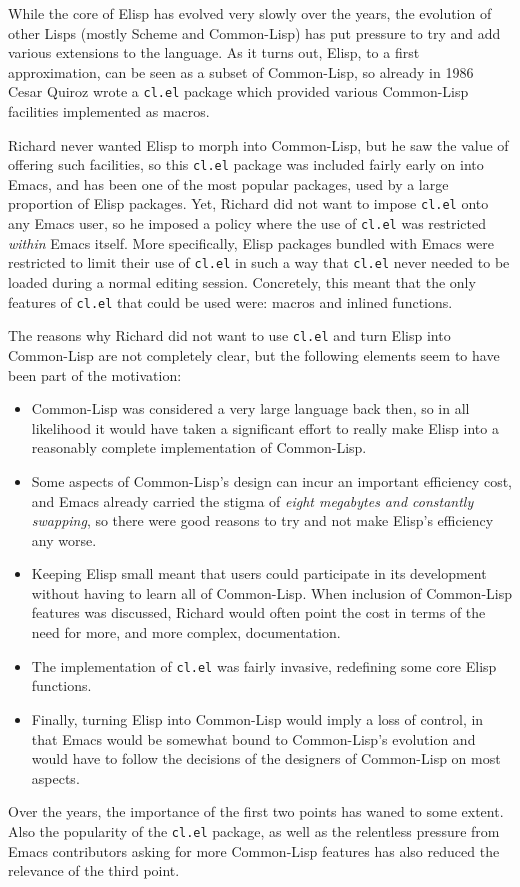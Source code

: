 \documentclass[format=acmsmall, review=false, screen=true]{acmart}
\newcommand \Elisp {Elisp}
\begin{document}
While the core of \Elisp{} has evolved very slowly over the years, the
evolution of other Lisps (mostly Scheme and Common-Lisp) has put pressure to
try and add various extensions to the language.  As it turns out, \Elisp{},
to a first approximation, can be seen as a subset of Common-Lisp, so already
in 1986 Cesar Quiroz wrote a \texttt{cl.el} package which provided various
Common-Lisp facilities implemented as macros.

Richard never wanted \Elisp{} to morph into Common-Lisp, but he saw the
value of offering such facilities, so this \texttt{cl.el} package was
included fairly early on into Emacs, and has been one of the most popular
packages, used by a large proportion of \Elisp{} packages.  Yet, Richard did
not want to impose \texttt{cl.el} onto any Emacs user, so he imposed
a policy where the use of \texttt{cl.el} was restricted \emph{within} Emacs
itself.  More specifically, \Elisp{} packages bundled with Emacs were
restricted to limit their use of \texttt{cl.el} in such a way that
\texttt{cl.el} never needed to be loaded during a normal editing session.
Concretely, this meant that the only features of \texttt{cl.el} that could
be used were: macros and inlined functions.

The reasons why Richard did not want to use \texttt{cl.el} and turn \Elisp{}
into Common-Lisp are not completely clear, but the following elements seem
to have been part of the motivation:
\begin{itemize}
\item Common-Lisp was considered a very large language back then, so in all
  likelihood it would have taken a significant effort to really make
  \Elisp{} into a reasonably complete implementation of Common-Lisp.
\item Some aspects of Common-Lisp's design can incur an important efficiency
  cost, and Emacs already carried the stigma of \emph{eight megabytes and
    constantly swapping}, so there were good reasons to try and not make
  \Elisp{}'s efficiency any worse.
\item Keeping \Elisp{} small meant that users could participate in its
  development without having to learn all of Common-Lisp.  When inclusion of
  Common-Lisp features was discussed, Richard would often point the cost
  in terms of the need for more, and more complex, documentation.
\item The implementation of \texttt{cl.el} was fairly invasive, redefining
  some core \Elisp{} functions.
\item Finally, turning \Elisp{} into Common-Lisp would imply a loss of control,
  in that Emacs would be somewhat bound to Common-Lisp's evolution and would
  have to follow the decisions of the designers of Common-Lisp on most aspects.
\end{itemize}
Over the years, the importance of the first two points has waned to some
extent.  Also the popularity of the \texttt{cl.el} package, as well as the
relentless pressure from Emacs contributors asking for more Common-Lisp
features has also reduced the relevance of the third point.
\end{document}

